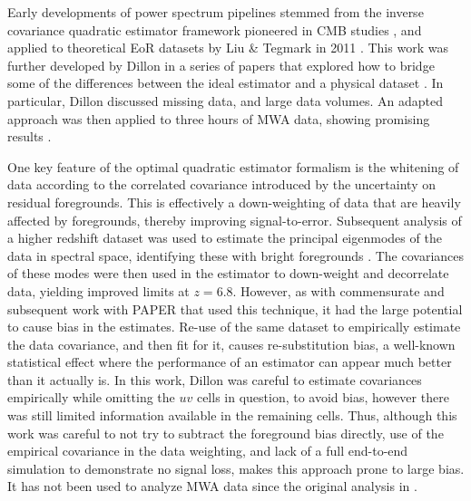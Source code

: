 Early developments of power spectrum pipelines stemmed from the inverse covariance quadratic estimator framework pioneered in CMB studies \cite{tegmark97}, and applied to theoretical EoR datasets by Liu \& Tegmark in 2011 \cite{liu11}. This work was further developed by Dillon in a series of papers that explored how to bridge some of the differences between the ideal estimator and a physical dataset \cite{dillon15,dillon13}. In particular, Dillon discussed missing data, and large data volumes. An adapted approach was then applied to three hours of MWA data, showing promising results \cite{dillon13}.

One key feature of the optimal quadratic estimator formalism is the whitening of data according to the correlated covariance introduced by the uncertainty on residual foregrounds. This is effectively a down-weighting of data that are heavily affected by foregrounds, thereby improving signal-to-error. Subsequent analysis of a higher redshift dataset was used to estimate the principal eigenmodes of the data in spectral space, identifying these with bright foregrounds \cite{dillon15}.
The covariances of these modes were then used in the estimator to down-weight and decorrelate data, yielding improved limits at $z=6.8$. However, as with commensurate and subsequent work with PAPER that used this technique, it had the large potential to cause bias in the estimates. Re-use of the same dataset to empirically estimate the data covariance, and then fit for it, causes re-substitution bias, a well-known statistical effect where the performance of an estimator can appear much better than it actually is. In this work, Dillon was careful to estimate covariances empirically while omitting the $uv$ cells in question, to avoid bias, however there was still limited information available in the remaining cells. Thus, although this work was careful to not try to subtract the foreground bias directly, use of the empirical covariance in the data weighting, and lack of a full end-to-end simulation to demonstrate no signal loss, makes this approach prone to large bias.  It has not been used to analyze MWA data since the original analysis in \cite{dillon15}.

